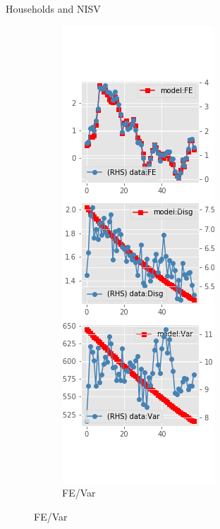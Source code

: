 \documentclass{beamer}
\begin{document}
\begin{frame}{Households and NISV}
	\begin{figure}[ht]
		\label{NISV_diag_SCE}
		\begin{subfigure}[b]{0.2\textwidth}
			\centering
			\caption{FE/Var}
			\includegraphics[width=\textwidth, height = 0.8\textheight]{figuresDraft/sce_ni_est_sv_diag0.png}

\end{subfigure}
\end{figure}
\end{frame}
\end{document}
